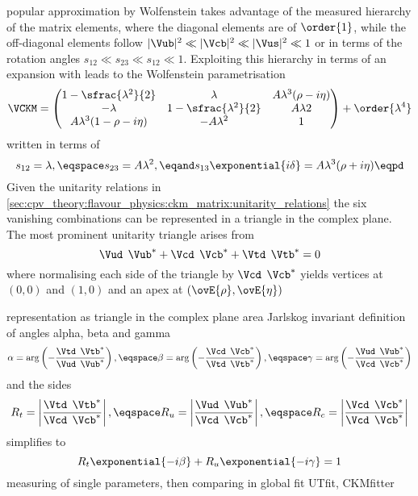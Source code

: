 popular approximation by Wolfenstein takes advantage of the measured hierarchy
of the matrix elements, where the diagonal elements are of $\order{1}$, while
the off-diagonal elements follow $\vert\Vub\vert^2 \ll \vert\Vcb\vert^2 \ll
\vert\Vus\vert^2 \ll 1$ or in terms of the rotation angles $s_{12} \ll s_{23}
\ll s_{12} \ll 1$. Exploiting this hierarchy in terms of an expansion with leads
to the Wolfenstein parametrisation
%
\begin{equation}  
  \VCKM = \begin{pmatrix}
    1 - \sfrac{\lambda^2}{2}        & \lambda                     & A \lambda^3 (\rho - i\eta)  \\
    -\lambda                        & 1 - \sfrac{\lambda^2}{2}    & A \lambda  2                \\
    A \lambda^3 (1 - \rho - i\eta)  & - A \lambda^2               & 1                           \\
  \end{pmatrix}
  + \order{\lambda^4}
\end{equation}
%
written in terms of
%
\begin{equation}
  s_{12} = \lambda, \eqspace s_{23} = A \lambda^2, \eqand s_{13}\exponential{i\delta} = A \lambda^3 (\rho + i \eta) \eqpd
\end{equation}
%
Given the unitarity relations in
\cref{sec:cpv_theory:flavour_physics:ckm_matrix:unitarity_relations} the six
vanishing combinations can be represented in a triangle in the complex plane.
The most prominent unitarity triangle arises from
%
\begin{equation}
  \Vud^{\phantom{\ast}}\Vub^{\ast} + \Vcd^{\phantom{\ast}}\Vcb^{\ast} + \Vtd^{\phantom{\ast}}\Vtb^{\ast} = 0 
\end{equation}
%
where normalising each side of the triangle by
$\Vcd^{\phantom{\ast}}\Vcb^{\ast}$ yields vertices at ${(0,0)}$ and ${(1,0)}$
and an apex at ${(\ovE{\rho},\ovE{\eta})}$ 

representation as triangle in the complex plane
area Jarlskog invariant
definition of angles alpha, beta and gamma
%
\begin{equation}
  \alpha = \arg\left(-\frac{\Vtd^{\phantom{\ast}}\Vtb^{\ast}}{\Vud^{\phantom{\ast}}\Vub^{\ast}}\right),\eqspace 
  \beta =  \arg\left(-\frac{\Vcd^{\phantom{\ast}}\Vcb^{\ast}}{\Vtd^{\phantom{\ast}}\Vtb^{\ast}}\right),\eqspace 
  \gamma = \arg\left(-\frac{\Vud^{\phantom{\ast}}\Vub^{\ast}}{\Vcd^{\phantom{\ast}}\Vcb^{\ast}}\right)
\end{equation}
%
and the sides
%
\begin{equation}
  R_t = \left| \frac{\Vtd^{\phantom{\ast}}\Vtb^{\ast}}{\Vcd^{\phantom{\ast}}\Vcb^{\ast}} \right|,\eqspace
  R_u = \left| \frac{\Vud^{\phantom{\ast}}\Vub^{\ast}}{\Vcd^{\phantom{\ast}}\Vcb^{\ast}} \right|,\eqspace
  R_c = \left| \frac{\Vcd^{\phantom{\ast}}\Vcb^{\ast}}{\Vcd^{\phantom{\ast}}\Vcb^{\ast}} \right|
\end{equation}
%
simplifies to
%
\begin{equation}
  R_t \exponential{-i\beta} + R_u \exponential{-i\gamma} = 1
\end{equation}
%
measuring of single parameters, then comparing in global fit
UTfit, CKMfitter

